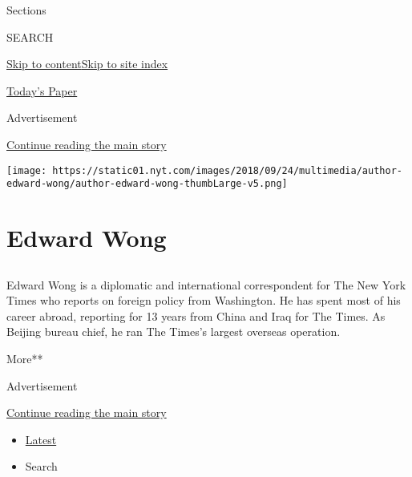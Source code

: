 Sections

SEARCH

\protect\hyperlink{site-content}{Skip to
content}\protect\hyperlink{site-index}{Skip to site index}

\href{https://myaccount.nytimes.com/auth/login?response_type=cookie\&client_id=vi}{}

\href{https://www.nytimes.com/section/todayspaper}{Today's Paper}

Advertisement

\protect\hyperlink{after-top}{Continue reading the main story}

\texttt{[image: https://static01.nyt.com/images/2018/09/24/multimedia/author-edward-wong/author-edward-wong-thumbLarge-v5.png]}

\hypertarget{edward-wong}{%
\section{Edward Wong}\label{edward-wong}}

\subsection{}

Edward Wong is a diplomatic and international correspondent for The New
York Times who reports on foreign policy from Washington. He has spent
most of his career abroad, reporting for 13 years from China and Iraq
for The Times. As Beijing bureau chief, he ran The Times's largest
overseas operation.

More**

Advertisement

\protect\hyperlink{after-mid1}{Continue reading the main story}

\begin{itemize}
\tightlist
\item
  \protect\hyperlink{stream-panel}{Latest}
\item
  Search
\end{itemize}

